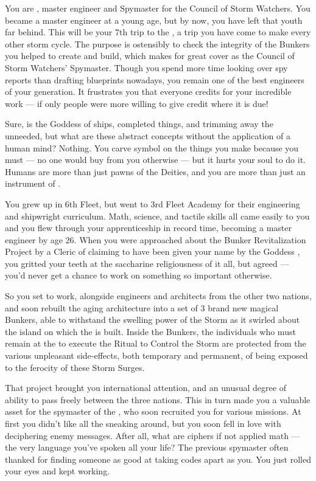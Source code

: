 \documentclass[char]{GL2020}
\begin{document}
\name{\cBunker{}}

You are \cBunker{\intro}, master engineer and Spymaster for the \pShip{} Council of Storm Watchers. You became a master engineer at a young age, but by now, you have left that youth far behind. This will be your 7th trip to the \pSchool{}, a trip you have come to make every other storm cycle. The purpose is ostensibly to check the integrity of the Bunkers you helped to create and build, which makes for great cover as the Council of Storm Watchers’ Spymaster. Though you spend more time looking over spy reports than drafting blueprints nowadays, you remain one of the best engineers of your generation. It frustrates you that everyone credits \cEbbFull{\intro} for your incredible work — if only people were more willing to give credit where it is due!

Sure, \cEbb{} is the Goddess of ships, completed things, and trimming away the unneeded, but what are these abstract concepts without the application of a human mind? Nothing. You carve \cEbb{\their} symbol on the things you make because you must — no one would buy from you otherwise — but it hurts your soul to do it. Humans are more than just pawns of the Deities, and you are more than just an instrument of \cEbb{\them}.

You grew up in 6th Fleet, but went to 3rd Fleet Academy for their engineering and shipwright curriculum. Math, science, and tactile skills all came easily to you and you flew through your apprenticeship in record time, becoming a master engineer by age 26. When you were approached about the Bunker Revitalization Project by a Cleric of \cEbb{} claiming to have been given your name by the Goddess \cEbb{\themself}, you gritted your teeth at the saccharine religiousness of it all, but agreed — you'd never get a chance to work on something so important otherwise. 

So you set to work, alongside engineers and architects from the other two nations, and soon rebuilt the aging architecture into a set of 3 brand new magical Bunkers, able to withstand the swelling power of the Storm as it swirled about the island on which the \pSchool{} is built. Inside the Bunkers, the individuals who must remain at the \pSc{} to execute the Ritual to Control the Storm are protected from the various unpleasant side-effects, both temporary and permanent, of being exposed to the ferocity of these Storm Surges.

That project brought you international attention, and an unusual degree of ability to pass freely between the three nations. This in turn made you a valuable asset for the spymaster of the \pShip{}, who soon recruited you for various missions. At first you didn't like all the sneaking around, but you soon fell in love with deciphering enemy messages. After all, what are ciphers if not applied math — the very language you've spoken all your life? The previous spymaster often thanked \cEbb{} for finding someone as good at taking codes apart as you. You just rolled your eyes and kept working.
\end{document}
